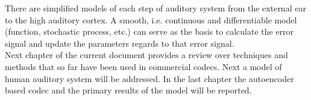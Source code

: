 There are simplified models of each step of auditory system from the external ear to the high auditory cortex. A smooth, i.e. continuous and differentiable model (function, stochastic process, etc.) can serve as the basis to calculate the error signal and update the parameters regards to that error signal.\\
Next chapter of the current document provides a review over techniques and methods that so far have been used in commercial codecs. Next a model of human auditory system will be addressed. In the last chapter the autoencoder based codec and the primary results of the model will be reported.